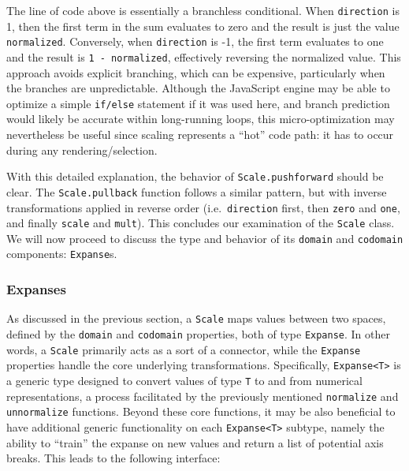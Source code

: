 \documentclass[
  openany]{book}
\theoremstyle{definition}
\theoremstyle{definition}
\theoremstyle{definition}
\theoremstyle{definition}
\theoremstyle{remark}
\begin{document}
The line of code above is essentially a branchless conditional. When \texttt{direction} is 1, then the first term in the sum evaluates to zero and the result is just the value \texttt{normalized}. Conversely, when \texttt{direction} is -1, the first term evaluates to one and the result is \texttt{1\ -\ normalized}, effectively reversing the normalized value. This approach avoids explicit branching, which can be expensive, particularly when the branches are unpredictable. Although the JavaScript engine may be able to optimize a simple \texttt{if/else} statement if it was used here, and branch prediction would likely be accurate within long-running loops, this micro-optimization may nevertheless be useful since scaling represents a ``hot'' code path: it has to occur during any rendering/selection.

With this detailed explanation, the behavior of \texttt{Scale.pushforward} should be clear. The \texttt{Scale.pullback} function follows a similar pattern, but with inverse transformations applied in reverse order (i.e.~\texttt{direction} first, then \texttt{zero} and \texttt{one}, and finally \texttt{scale} and \texttt{mult}). This concludes our examination of the \texttt{Scale} class. We will now proceed to discuss the type and behavior of its \texttt{domain} and \texttt{codomain} components: \texttt{Expanse}s.

\subsubsection{Expanses}\label{expanses}

As discussed in the previous section, a \texttt{Scale} maps values between two spaces, defined by the \texttt{domain} and \texttt{codomain} properties, both of type \texttt{Expanse}. In other words, a \texttt{Scale} primarily acts as a sort of a connector, while the \texttt{Expanse} properties handle the core underlying transformations. Specifically, \texttt{Expanse\textless{}T\textgreater{}} is a generic type designed to convert values of type \texttt{T} to and from numerical representations, a process facilitated by the previously mentioned \texttt{normalize} and \texttt{unnormalize} functions. Beyond these core functions, it may be also beneficial to have additional generic functionality on each \texttt{Expanse\textless{}T\textgreater{}} subtype, namely the ability to ``train'' the expanse on new values and return a list of potential axis breaks. This leads to the following interface:
\end{document}
